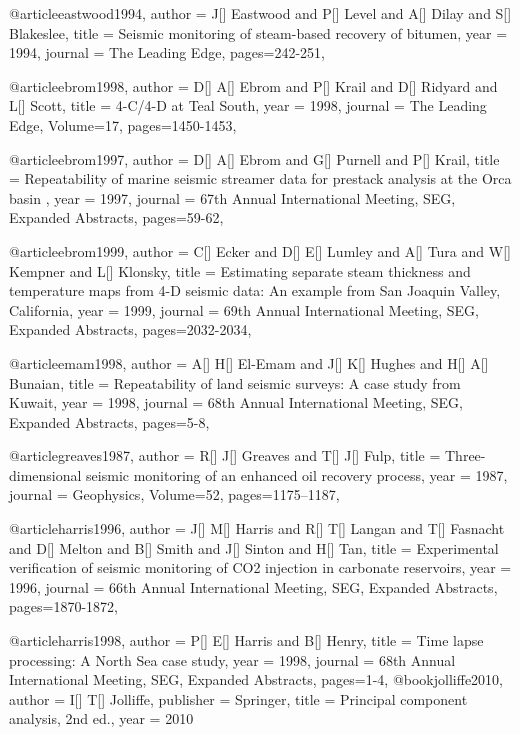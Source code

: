 @article{eastwood1994,
  author =	 {J[] Eastwood and P[] Level and A[] Dilay and S[] Blakeslee},
  title =	 {Seismic monitoring of steam-based recovery of bitumen},
  year =	 1994,
  journal =	 {The Leading Edge},
 pages=242-251,
}

@article{ebrom1998,
  author =	 {D[] A[] Ebrom and P[] Krail and D[] Ridyard and L[] Scott},
  title =	 {4-C/4-D at Teal South},
  year =	 1998,
  journal =	 {The Leading Edge},
    Volume=17,
 pages=1450-1453,
}

@article{ebrom1997,
  author =	 {D[] A[] Ebrom and G[] Purnell and P[] Krail},
  title =	 { Repeatability of marine seismic streamer data for prestack analysis at the Orca basin },
  year =	 1997,
  journal =	 {67th Annual International Meeting, SEG, Expanded Abstracts},
 pages=59-62,
}

@article{ebrom1999,
  author =	 {C[] Ecker and D[] E[] Lumley and A[] Tura and W[] Kempner and L[] Klonsky},
  title =	 {Estimating separate steam thickness and temperature maps from 4-D seismic data: An example from San Joaquin Valley, California},
  year =	 1999,
  journal =	 {69th Annual International Meeting, SEG, Expanded Abstracts},
 pages=2032-2034,
}

@article{emam1998,
  author =	 {A[] H[] El-Emam and J[] K[] Hughes and H[] A[] Bunaian},
  title =	 {Repeatability of land seismic surveys: A case study from Kuwait},
  year =	 1998,
  journal =	 {68th Annual International Meeting, SEG, Expanded Abstracts},
 pages=5-8,
}


@article{greaves1987,
  author =	 {R[] J[] Greaves and T[] J[] Fulp},
  title =	 {Three-dimensional seismic monitoring of an enhanced oil recovery process},
  year =	 1987,
  journal =	 {Geophysics},
    Volume=52,
 pages=1175–1187,
}

@article{harris1996,
  author =	 {J[] M[] Harris and R[] T[] Langan and T[] Fasnacht and D[] Melton and B[] Smith and J[] Sinton and H[] Tan},
  title =	 {Experimental verification of seismic monitoring of CO2 injection in carbonate reservoirs},
  year =	 1996,
  journal =	 {66th Annual International Meeting, SEG, Expanded Abstracts},
 pages=1870-1872,
}

@article{harris1998,
  author =	 {P[] E[] Harris and B[] Henry},
  title =	 {Time lapse processing: A North Sea case study},
  year =	 1998,
  journal =	 {68th Annual International Meeting, SEG, Expanded Abstracts},
 pages=1-4,
}
@book{jolliffe2010,
   author =       {I[] T[] Jolliffe},
   publisher =    {Springer},
   title =        {Principal component analysis, 2nd ed.},
   year =         {2010}
}

